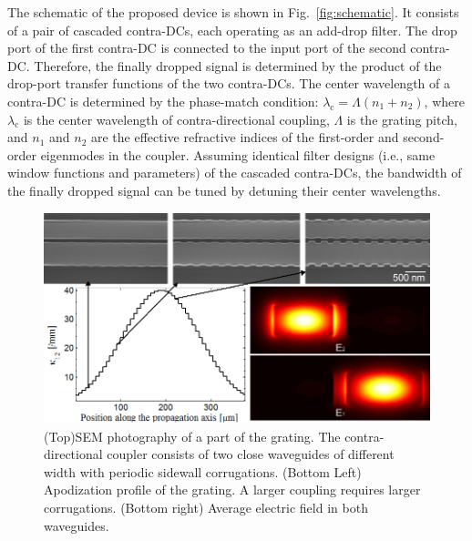 \documentclass[osajnl,twocolumn,showpacs,superscriptaddress,10pt]{revtex4-1}
\begin{document}
The schematic of the proposed device is shown in Fig.~\ref{fig:schematic}. 
It consists of a pair of cascaded contra-DCs, each operating as an add-drop filter. 
The drop port of the first contra-DC is connected to the input port of the second contra-DC. 
Therefore, the finally dropped signal is determined by the product of the  drop-port transfer functions of the two contra-DCs. The center wavelength of a contra-DC is determined by the phase-match condition: $\lambda_\text{c} = \Lambda (n_\text{1}+n_\text{2})$, where $\lambda_\text{c}$ is the center wavelength of contra-directional coupling, $\Lambda$ is the grating pitch, and $n_\text{1}$ and $n_\text{2}$ are the effective refractive indices of the first-order and second-order eigenmodes in the coupler. 
Assuming identical filter designs (i.e., same window functions and parameters) of the cascaded contra-DCs, the bandwidth of the finally dropped signal can be tuned by detuning their center wavelengths.



\begin{figure}[htbp]
  \centering
  \includegraphics[width=1\columnwidth]{data/FigApod}
  \caption{(Top)SEM photography of a part of the grating. The contra-directional coupler consists of two close waveguides of different width with periodic sidewall corrugations. (Bottom Left) Apodization profile of the grating. A larger coupling requires larger corrugations. (Bottom right) Average electric field in both waveguides. }
  \label{fig:SEM}
\end{figure} 
\end{document}
